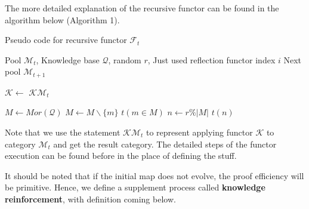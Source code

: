 \documentclass{aims}
\numberwithin{theorem}{section}	%
\numberwithin{axiom}{section}	%
\numberwithin{definition}{section}	%
\begin{document}
The more detailed explanation of the recursive functor can be found in the algorithm below (Algorithm 1).

\begin{algorithm}[h!]
	\caption{Pseudo code for recursive functor $\mathcal{F}_t$}
	\begin{algorithmic}[1]
		\Require Pool $\mathcal{M}_{t}$, Knowledge base $\mathcal{Q}$, random $\mathit{r}$, Just used reflection functor index $i$
		\Ensure Next pool $\mathcal{M}_{t+1}$
		
			\State $\mathcal{K} \gets $ 
			\State \Return $\mathcal{K} \mathcal{M}_t$
		\EndFunction
		
			\State $M \gets Mor(\mathcal{Q})$
					\State $M \gets M \backslash \{m\}$
				\EndIf
			\EndFor
				\State \Return $t(m \in M)$
			\Else
				\State $n \gets \mathit{r} \% |M|$
				\State \Return $t(n)$
			\EndIf
		\EndFunction
	\end{algorithmic}
\end{algorithm}

Note that we use the statement $\mathcal{K} \mathcal{M}_t$ to represent applying functor $\mathcal{K}$ to category $\mathcal{M}_t$ and get the result category. The detailed steps of the functor execution can be found before in the place of defining the stuff.

It should be noted that if the initial map does not evolve, the proof efficiency will be primitive. Hence, we define a supplement process called \textbf{ knowledge reinforcement}, with definition coming below.
\end{document}
